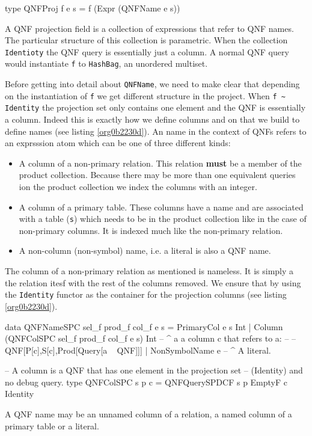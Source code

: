 \begin{listing}[p]
  \begin{haskell}
    type QNFProj f e s = f (Expr (QNFName e s))
  \end{haskell}
  \caption{\label{orgcefa865}A QNF projection field is a collection of expressions that refer to QNF names. The particular structure of this collection is parametric. When the collection \texttt{Identioty} the QNF query is essentially just a column. A normal QNF query would instantiate \texttt{f} to \texttt{HashBag}, an unordered multiset.}
\end{listing}

Before getting into detail about \texttt{QNFName}, we need to make clear that
depending on the instantiation of \texttt{f} we get different structure in
the project. When \texttt{f \textasciitilde{} Identity} the projection set only contains one
element and the QNF is essentially a column. Indeed this is exactly
how we define columns and on that we build to define names (see
listing \ref{org0b2230d}). An name in the context of QNFs refers to an
exprsssion atom which can be one of three different kinds:

\begin{itemize}
\item A column of a non-primary relation. This relation \textbf{must} be a member
  of the product collection. Because there may be more than one
  equivalent queries ion the product collection we index the columns
  with an integer.
\item A column of a primary table. These columns have a name and are
  associated with a table (\texttt{s}) which needs to be in the product
  collection like in the case of non-primary columns. It is indexed
  much like the non-primary relation.
\item A non-column (non-symbol) name, i.e. a literal is also a QNF name.
\end{itemize}

The column of a non-primary relation as mentioned is nameless. It is
simply a the relation itesf with the rest of the columns removed. We
ensure that by using the \texttt{Identity} functor as the container for the
projection columns (see listing \ref{org0b2230d}).

\begin{listing}[p]
  \begin{haskell}
    data QNFNameSPC sel_f prod_f col_f e s
    = PrimaryCol e s Int
    | Column (QNFColSPC sel_f prod_f col_f e s) Int
    -- ^ a a column c that refers to a:
    --
    -- QNF[P[c],S[c],Prod[Query[a ~ QNF]]]
    | NonSymbolName e
    -- ^ A literal.

    -- A column is a QNF that has one element in the projection set
    -- (Identity) and no debug query.
    type QNFColSPC s p c = QNFQuerySPDCF s p EmptyF c Identity
  \end{haskell}
  \caption{\label{org0b2230d}A QNF name may be an unnamed column of a relation, a named column of a primary table or a literal.}
\end{listing}

